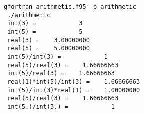 \begin{Verbatim}[frame=lines,label=arithmetic - commands and output]
 gfortran arithmetic.f95 -o arithmetic
 ./arithmetic
 int(3) =            3
 int(5) =            5
 real(3) =    3.00000000    
 real(5) =    5.00000000    
 int(5)/int(3) =            1
 real(5)/real(3) =    1.66666663    
 int(5)/real(3) =    1.66666663    
 real(1)*int(5)/int(3) =    1.66666663    
 int(5)/int(3)*real(1) =    1.00000000    
 real(5)/real(3) =    1.66666663    
 int(5.)/int(3.) =            1
\end{Verbatim}
